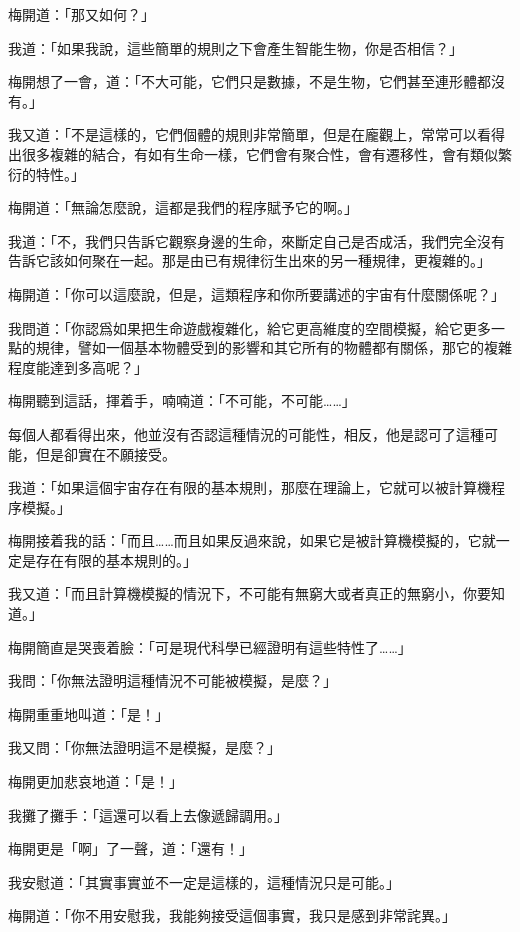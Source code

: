 
梅開道：「那又如何？」

我道：「如果我說，這些簡單的規則之下會產生智能生物，你是否相信？」

梅開想了一會，道：「不大可能，它們只是數據，不是生物，它們甚至連形體都沒有。」

我又道：「不是這樣的，它們個體的規則非常簡單，但是在龐觀上，常常可以看得出很多複雜的結合，有如有生命一樣，它們會有聚合性，會有遷移性，會有類似繁衍的特性。」

梅開道：「無論怎麼說，這都是我們的程序賦予它的啊。」

我道：「不，我們只告訴它觀察身邊的生命，來斷定自己是否成活，我們完全沒有告訴它該如何聚在一起。那是由已有規律衍生出來的另一種規律，更複雜的。」

梅開道：「你可以這麼說，但是，這類程序和你所要講述的宇宙有什麼關係呢？」

我問道：「你認爲如果把生命遊戲複雜化，給它更高維度的空間模擬，給它更多一點的規律，譬如一個基本物體受到的影響和其它所有的物體都有關係，那它的複雜程度能達到多高呢？」


梅開聽到這話，揮着手，喃喃道：「不可能，不可能……」

每個人都看得出來，他並沒有否認這種情況的可能性，相反，他是認可了這種可能，但是卻實在不願接受。

我道：「如果這個宇宙存在有限的基本規則，那麼在理論上，它就可以被計算機程序模擬。」

梅開接着我的話：「而且……而且如果反過來說，如果它是被計算機模擬的，它就一定是存在有限的基本規則的。」

我又道：「而且計算機模擬的情況下，不可能有無窮大或者真正的無窮小，你要知道。」

梅開簡直是哭喪着臉：「可是現代科學已經證明有這些特性了……」

我問：「你無法證明這種情況不可能被模擬，是麼？」

梅開重重地叫道：「是！」

我又問：「你無法證明這不是模擬，是麼？」

梅開更加悲哀地道：「是！」

我攤了攤手：「這還可以看上去像遞歸調用。」

梅開更是「啊」了一聲，道：「還有！」

我安慰道：「其實事實並不一定是這樣的，這種情況只是可能。」

梅開道：「你不用安慰我，我能夠接受這個事實，我只是感到非常詫異。」

